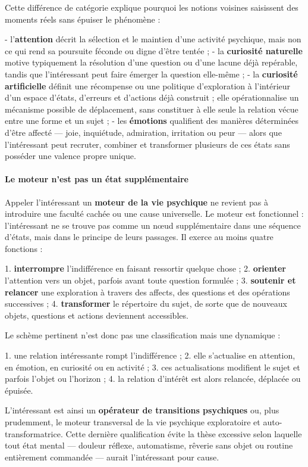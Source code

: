 \documentclass[10pt,a4paper]{article}
\begin{document}
Cette différence de catégorie explique pourquoi les notions voisines saisissent des moments réels sans épuiser le phénomène :

- l'\textbf{attention} décrit la sélection et le maintien d'une activité psychique, mais   non ce qui rend sa poursuite féconde ou digne d'être tentée ; - la \textbf{curiosité naturelle} motive typiquement la résolution d'une question ou   d'une lacune déjà repérable, tandis que l'intéressant peut faire émerger la   question elle-même ; - la \textbf{curiosité artificielle} définit une récompense ou une politique   d'exploration à l'intérieur d'un espace d'états, d'erreurs et d'actions déjà   construit ; elle opérationnalise un mécanisme possible de déplacement, sans   constituer à elle seule la relation vécue entre une forme et un sujet ; - les \textbf{émotions} qualifient des manières déterminées d'être affecté — joie,   inquiétude, admiration, irritation ou peur — alors que l'intéressant peut recruter,   combiner et transformer plusieurs de ces états sans posséder une valence propre   unique.

\paragraph{Le moteur n'est pas un état supplémentaire}
Appeler l'intéressant un \textbf{moteur de la vie psychique} ne revient pas à introduire une faculté cachée ou une cause universelle. Le moteur est fonctionnel : l'intéressant ne se trouve pas comme un nœud supplémentaire dans une séquence d'états, mais dans le principe de leurs passages. Il exerce au moins quatre fonctions :

1. \textbf{interrompre} l'indifférence en faisant ressortir quelque chose ; 2. \textbf{orienter} l'attention vers un objet, parfois avant toute question formulée ; 3. \textbf{soutenir et relancer} une exploration à travers des affects, des questions et    des opérations successives ; 4. \textbf{transformer} le répertoire du sujet, de sorte que de nouveaux objets, questions    et actions deviennent accessibles.

Le schème pertinent n'est donc pas une classification mais une dynamique :

1. une relation intéressante rompt l'indifférence ; 2. elle s'actualise en attention, en émotion, en curiosité ou en activité ; 3. ces actualisations modifient le sujet et parfois l'objet ou l'horizon ; 4. la relation d'intérêt est alors relancée, déplacée ou épuisée.

L'intéressant est ainsi un \textbf{opérateur de transitions psychiques} ou, plus prudemment, le moteur transversal de la vie psychique exploratoire et auto-transformatrice. Cette dernière qualification évite la thèse excessive selon laquelle tout état mental — douleur réflexe, automatisme, rêverie sans objet ou routine entièrement commandée — aurait l'intéressant pour cause.
\end{document}
